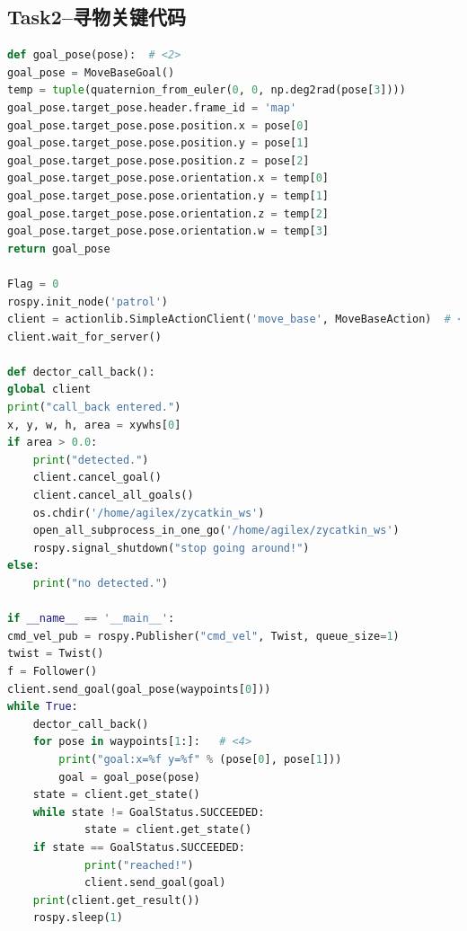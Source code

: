 \documentclass[a4paper,twoside]{article}
\begin{document}
\subsection{Task2--寻物关键代码}
\begin{lstlisting}[language=python, caption=基本巡航框架]
def goal_pose(pose):  # <2>
goal_pose = MoveBaseGoal()
temp = tuple(quaternion_from_euler(0, 0, np.deg2rad(pose[3])))
goal_pose.target_pose.header.frame_id = 'map'
goal_pose.target_pose.pose.position.x = pose[0]
goal_pose.target_pose.pose.position.y = pose[1]
goal_pose.target_pose.pose.position.z = pose[2]
goal_pose.target_pose.pose.orientation.x = temp[0]
goal_pose.target_pose.pose.orientation.y = temp[1]
goal_pose.target_pose.pose.orientation.z = temp[2]
goal_pose.target_pose.pose.orientation.w = temp[3]
return goal_pose

Flag = 0
rospy.init_node('patrol')
client = actionlib.SimpleActionClient('move_base', MoveBaseAction)  # <3>
client.wait_for_server()

def dector_call_back():
global client
print("call_back entered.")
x, y, w, h, area = xywhs[0]
if area > 0.0:
	print("detected.")
	client.cancel_goal()
	client.cancel_all_goals()
	os.chdir('/home/agilex/zycatkin_ws') 
	open_all_subprocess_in_one_go('/home/agilex/zycatkin_ws')
	rospy.signal_shutdown("stop going around!")
else:
	print("no detected.")

if __name__ == '__main__':
cmd_vel_pub = rospy.Publisher("cmd_vel", Twist, queue_size=1)
twist = Twist()
f = Follower()
client.send_goal(goal_pose(waypoints[0]))
while True:
	dector_call_back()
	for pose in waypoints[1:]:   # <4>
		print("goal:x=%f y=%f" % (pose[0], pose[1]))
		goal = goal_pose(pose)
	state = client.get_state()
	while state != GoalStatus.SUCCEEDED:
			state = client.get_state()
	if state == GoalStatus.SUCCEEDED:
			print("reached!")
			client.send_goal(goal)
	print(client.get_result())
	rospy.sleep(1)
\end{lstlisting}
\end{document}
